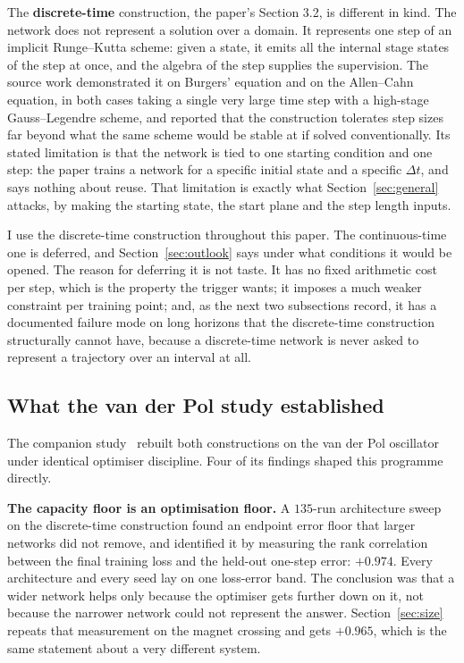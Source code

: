 \documentclass[11pt,a4paper]{article}
\begin{document}
The \textbf{discrete-time} construction, the paper's Section 3.2, is different
in kind. The network does not represent a solution over a domain. It represents
one step of an implicit Runge--Kutta scheme: given a state, it emits all the
internal stage states of the step at once, and the algebra of the step supplies
the supervision. The source work demonstrated it on Burgers' equation and on the
Allen--Cahn equation, in both cases taking a single very large time step with a
high-stage Gauss--Legendre scheme, and reported that the construction tolerates
step sizes far beyond what the same scheme would be stable at if solved
conventionally. Its stated limitation is that the network is tied to one
starting condition and one step: the paper trains a network for a specific
initial state and a specific $\Delta t$, and says nothing about reuse. That
limitation is exactly what Section~\ref{sec:general} attacks, by making the
starting state, the start plane and the step length inputs.

I use the discrete-time construction throughout this paper. The continuous-time
one is deferred, and Section~\ref{sec:outlook} says under what conditions it
would be opened. The reason for deferring it is not taste. It has no fixed
arithmetic cost per step, which is the property the trigger wants; it imposes a
much weaker constraint per training point; and, as the next two subsections
record, it has a documented failure mode on long horizons that the discrete-time
construction structurally cannot have, because a discrete-time network is never
asked to represent a trajectory over an interval at all.

\subsection{What the van der Pol study established}

The companion study~\cite{scriven2026vdp} rebuilt both constructions on the van
der Pol oscillator under identical optimiser discipline. Four of its findings
shaped this programme directly.

\textbf{The capacity floor is an optimisation floor.} A $135$-run architecture
sweep on the discrete-time construction found an endpoint error floor that
larger networks did not remove, and identified it by measuring the rank
correlation between the final training loss and the held-out one-step error:
$+0.974$. Every architecture and every seed lay on one loss-error band. The
conclusion was that a wider network helps only because the optimiser gets
further down on it, not because the narrower network could not represent the
answer. Section~\ref{sec:size} repeats that measurement on the magnet crossing
and gets $+0.965$, which is the same statement about a very different system.
\end{document}
